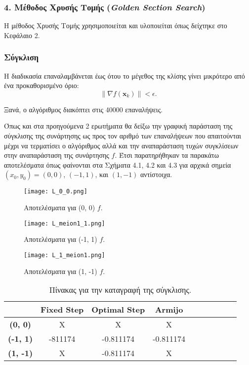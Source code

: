 \documentclass[a4paper,12pt]{report}
\newcommand{\en}{\selectlanguage{english}}
\newcommand{\gr}{\selectlanguage{greek}}
\begin{document}
\subsubsection*{4. Μέθοδος Χρυσής Τομής \en (\textit{Golden Section Search}) \gr}
Η μέθοδος Χρυσής Τομής χρησιμοποιείται και υλοποιείται όπως δείχτηκε στο Κεφάλαιο 2.

\subsubsection*{Σύγκλιση}
Η διαδικασία επαναλαμβάνεται έως ότου το μέγεθος της κλίσης γίνει μικρότερο από ένα προκαθορισμένο όριο:
\[
\|\nabla f(\mathbf{x}_k)\| < \epsilon.
\]

\hspace{-0.6cm}Ξανά, ο αλγόριθμος διακόπτει στις 40000 επαναλήψεις.

\vspace{0.5cm}

\hspace{-0.6cm}Όπως και στα προηγούμενα 2 ερωτήματα θα δείξω την γραφική παράσταση της σύγκλισης της συνάρτησης ως προς τον αριθμό των επαναλήψεων που απαιτούνται μέχρι να τερματίσει ο αλγόριθμος αλλά και την αναπαράσταση τυχών συγκλίσεων στην αναπαράσταση της συνάρτησης \(f\). Έτσι παρατηρήθηκαν τα παρακάτω αποτελέσματα όπως φαίνονται στα Σχήματα 4.1, 4.2 και 4.3 για αρχικά σημεία \((x_0, y_0) = (0,0)\), \((-1,1)\), και \((1,-1)\) αντίστοιχα.

\begin{figure}[ht!]
    \centering
    \texttt{[image: L\_0\_0.png]} 
    \caption{Αποτελέσματα για (0, 0) \(f\).}
\end{figure}

\begin{figure}[ht!]
    \centering
    \texttt{[image: L\_meion1\_1.png]} 
    \caption{Αποτελέσματα για (-1, 1) \(f\).}
\end{figure}

\begin{figure}[ht!]
    \centering
    \texttt{[image: L\_1\_meion1.png]} 
    \caption{Αποτελέσματα για (1, -1) \(f\).}
\end{figure}

\clearpage

\begin{table}[H]
\centering
\renewcommand{\arraystretch}{2} %
\setlength{\tabcolsep}{12pt} %
\begin{tabular}{|c|c|c|c|c|c|c|c|c|c|}
\hline
& \textbf{\en Fixed Step\gr} & \textbf{\en Optimal Step\gr} & \textbf{\en Armijo \gr} \\ \hline
\en
\textbf{(0, 0)} &Χ   &Χ   &Χ  \\ \hline
\textbf{(-1, 1)} &\en -811174   &\en -0.811174   &\en -0.811174  \\ \hline
\textbf{(1, -1)} &Χ   &\en-0.811174   &\en X  \\ \hline
\end{tabular}
\caption{Πίνακας για την καταγραφή της σύγκλισης.}
\label{tab:large3_convergence}
\end{table}
\end{document}
